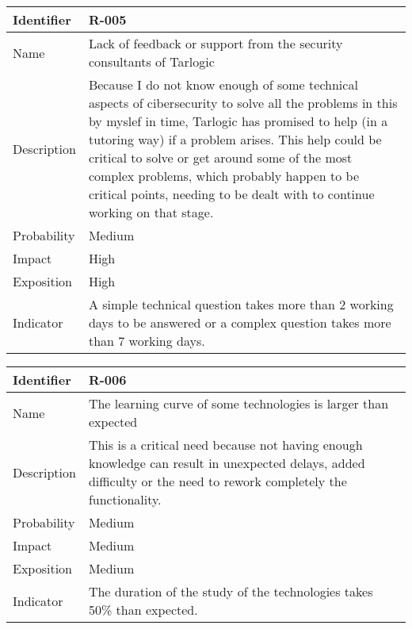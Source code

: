 \begin{table}[H]
	\begin{tabularx}{\textwidth}{|l|X|}
		\hline
		\rowcolor{gray!30}
		Identifier & \textbf{R-005} \\ \hline
		Name & Lack of feedback or support from the security consultants of Tarlogic\\ \hline
		Description & Because I do not know enough of some technical aspects of cibersecurity to solve all the problems in this by myslef in time, Tarlogic has promised to help (in a tutoring way) if a problem arises.
		This help could be critical to solve or get around some of the most complex problems, which probably happen to be critical points, needing to be dealt with to continue working on that stage.\\ \hline
		Probability & Medium\\ \hline
		Impact &  High\\ \hline
		Exposition &  High\\ \hline
		Indicator & A simple technical question takes more than 2 working days to be answered or a complex question takes more than 7 working days.\\ \hline
	\end{tabularx}
\end{table}



\begin{table}[H]
	\begin{tabularx}{\textwidth}{|l|X|}
		\hline
		\rowcolor{gray!30}
		Identifier & \textbf{R-006} \\ \hline
		Name & The learning curve of some technologies is larger than expected\\ \hline
		Description & This is a critical need because not having enough knowledge can result in unexpected delays, added difficulty or the need to rework completely the functionality.\\ \hline
		Probability & Medium\\ \hline
		Impact &  Medium\\ \hline
		Exposition &  Medium\\ \hline
		Indicator & The duration of the study of the technologies takes 50\% than expected. \\ \hline
	\end{tabularx}
\end{table}

